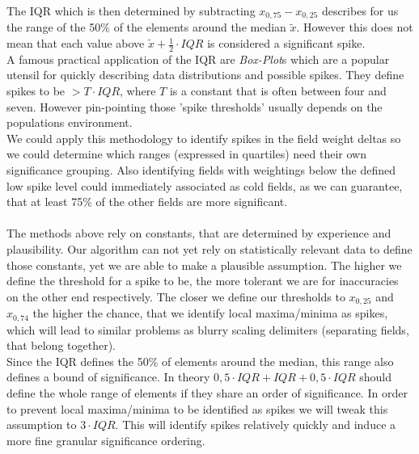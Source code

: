 The IQR which is then determined by subtracting $x_{0,75}-x_{0,25}$ describes for us the range of the 50\% of the elements around the median $\tilde{x}$. However this does not mean that each value above $\tilde{x}+\frac{1}{2}\cdot IQR$ is considered a significant spike.\\
A famous practical application of the IQR are \textit{Box-Plot}s  which are a popular utensil for quickly describing data distributions and possible spikes. They define spikes to be $> T\cdot IQR$, where $T$ is a constant that is often between four and seven. However pin-pointing those 'spike thresholds' usually depends on the populations environment.\\
We could apply this methodology to identify spikes in the field weight deltas so we could determine which ranges (expressed in quartiles) need their own significance grouping. Also identifying fields with weightings below the defined low spike level could immediately associated as cold fields, as we can guarantee, that at least 75\% of the other fields are more significant.\\\\
The methods above rely on constants, that are determined by experience and plausibility. Our algorithm can not yet rely on statistically relevant data to define those constants, yet we are able to make a plausible assumption. The higher we define the threshold for a spike to be, the more tolerant we are for inaccuracies on the other end respectively. The closer we define our thresholds to $x_{0,25}$ and $x_{0,74}$ the higher the chance, that we identify local maxima/minima as spikes, which will lead to similar problems as blurry scaling delimiters (separating fields, that belong together).\\
Since the IQR defines the 50\% of elements around the median, this range also defines a bound of significance. In theory $0,5\cdot IQR+IQR+0,5\cdot IQR$ should define the whole range of elements if they share an order of significance. In order to prevent local maxima/minima to be identified as spikes we will tweak this assumption to $3\cdot IQR$. This will identify spikes relatively quickly and induce a more fine granular significance ordering.


